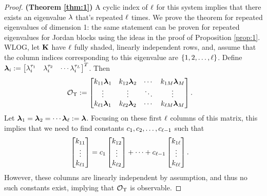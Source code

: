 \begin{proof}
\textbf{(Theorem \ref{thm:1})}
A cyclic index of $\ell$ for this system implies that there exists an eigenvalue $\lambda$ that's repeated $\ell$
times. We prove the theorem for repeated eigenvalues of dimension 1: the same statement can be proven for repeated eigenvalues for Jordan blocks using the ideas in the proof of Proposition \ref{prop:1}. 
WLOG, let $\mathbf{K}$ have $\ell$ fully shaded, linearly independent rows, and, assume that the column indices corresponding to this eigenvalue are $\{1,2,\dots,\ell\}$. Define 
$\boldsymbol{\lambda}_i:= \begin{bmatrix}\lambda_i^{\tau_1} & \lambda_i^{\tau_2} & \cdots \lambda_i^{\tau_{L}}\end{bmatrix}^T$. Then
	\begin{align*}
	\mathcal{O}_{\Upsilon}
	&:= 
	\begin{bmatrix}
	k_{11} \boldsymbol{\lambda}_1 & k_{12} \boldsymbol{\lambda}_2 & \cdots & k_{1M} \boldsymbol{\lambda}_{M}\\
	\vdots & \vdots & \ddots & \vdots\\
	k_{\ell 1} \boldsymbol{\lambda}_1 & k_{\ell 2} \boldsymbol{\lambda}_2 & \cdots & k_{\ell M} \boldsymbol{\lambda}_{M}
	\end{bmatrix}.
	\end{align*}
	Let $\boldsymbol{\lambda}_1 = \boldsymbol{\lambda}_2 = \cdots \boldsymbol{\lambda}_{\ell} := \boldsymbol{\lambda}$. 
	Focusing on these first $\ell$ columns of this matrix, this implies that
	we need to find constants $c_1,c_2,\dots, c_{\ell-1}$ such that
	\begin{align*}
	\begin{bmatrix}
	k_{11}\\
	\vdots\\
	k_{\ell 1}
	\end{bmatrix}
	&= 
	c_1 
	\begin{bmatrix}
	k_{12}\\
	\vdots\\
	k_{\ell 2}
	\end{bmatrix}
	+ \cdots + 
	c_{\ell-1} 
	\begin{bmatrix}
	k_{1\ell}\\   
	\vdots\\
	k_{\ell \ell} 
	\end{bmatrix}.
	\end{align*}
	However, these columns are linearly independent by assumption, and thus no such constants exist, implying that $\mathcal{O}_{\Upsilon}$ is observable. 
\end{proof}
